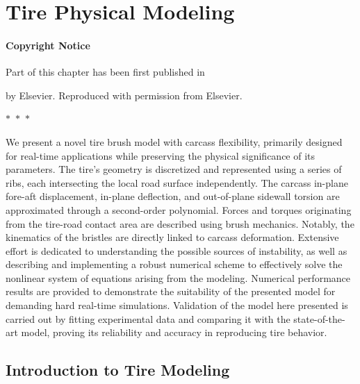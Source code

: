 
\chapter{Tire Physical Modeling}
\label{app3:tire_physical_model}

\subsubsection*{Copyright Notice}
Part of this chapter has been first published in
%
\begin{center}
  \begin{minipage}{0.9\textwidth}
  \end{minipage}
\end{center}
%
by Elsevier. Reproduced with permission from Elsevier.

\begin{center}
  $\ast$~$\ast$~$\ast$
\end{center}

We present a novel tire brush model with carcass flexibility, primarily designed for real-time applications while preserving the physical significance of its parameters. The tire's geometry is discretized and represented using a series of ribs, each intersecting the local road surface independently. The carcass in-plane fore-aft displacement, in-plane deflection, and out-of-plane sidewall torsion are approximated through a second-order polynomial. Forces and torques originating from the tire-road contact area are described using brush mechanics. Notably, the kinematics of the bristles are directly linked to carcass deformation. Extensive effort is dedicated to understanding the possible sources of instability, as well as describing and implementing a robust numerical scheme to effectively solve the nonlinear system of equations arising from the modeling. Numerical performance results are provided to demonstrate the suitability of the presented model for demanding hard real-time simulations.   Validation of the model here presented is carried out by fitting experimental data and comparing it with the state-of-the-art \MagicFormulae{} model, proving its reliability and accuracy in reproducing tire behavior.


\section{Introduction to Tire Modeling}
\label{app3:sec:introduction}

